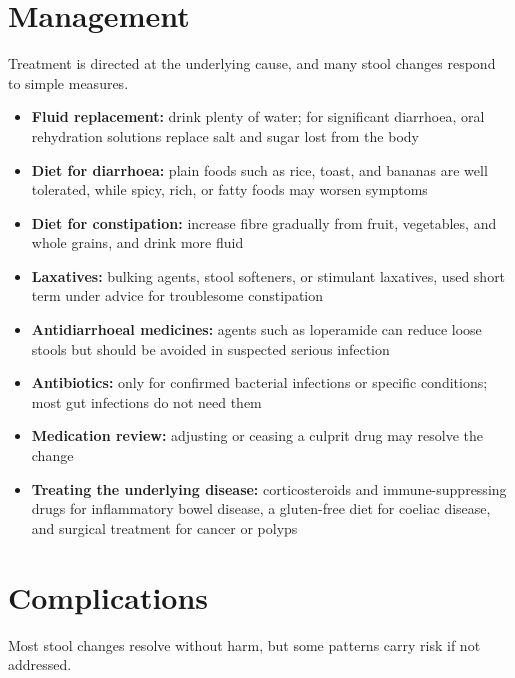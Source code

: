 \section*{Management}
Treatment is directed at the underlying cause, and many stool changes respond to simple measures.

\begin{itemize}
    \item \textbf{Fluid replacement:} drink plenty of water; for significant diarrhoea, oral rehydration solutions replace salt and sugar lost from the body
    \item \textbf{Diet for diarrhoea:} plain foods such as rice, toast, and bananas are well tolerated, while spicy, rich, or fatty foods may worsen symptoms
    \item \textbf{Diet for constipation:} increase fibre gradually from fruit, vegetables, and whole grains, and drink more fluid
    \item \textbf{Laxatives:} bulking agents, stool softeners, or stimulant laxatives, used short term under advice for troublesome constipation
    \item \textbf{Antidiarrhoeal medicines:} agents such as loperamide can reduce loose stools but should be avoided in suspected serious infection
    \item \textbf{Antibiotics:} only for confirmed bacterial infections or specific conditions; most gut infections do not need them
    \item \textbf{Medication review:} adjusting or ceasing a culprit drug may resolve the change
    \item \textbf{Treating the underlying disease:} corticosteroids and immune-suppressing drugs for inflammatory bowel disease, a gluten-free diet for coeliac disease, and surgical treatment for cancer or polyps
\end{itemize}

\section*{Complications}
Most stool changes resolve without harm, but some patterns carry risk if not addressed.

